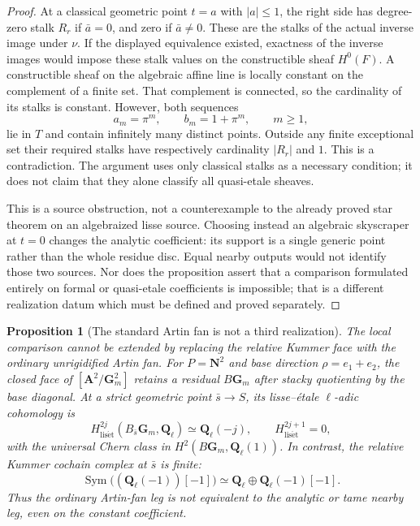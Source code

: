 \documentclass[11pt]{article}
\newtheorem{proposition}[theorem]{Proposition}
\theoremstyle{definition}
\theoremstyle{remark}
\begin{document}
\begin{proof}
At a classical geometric point $t=a$ with $|a|\le1$, the right side
has degree-zero stalk $R_r$ if $\bar a=0$, and zero if $\bar a\ne0$.
These are the stalks of the actual inverse image under $\nu$.
If the displayed equivalence existed, exactness of the inverse images
would impose these stalk values on the constructible sheaf $H^0(F)$.
A constructible sheaf on the algebraic affine line is locally constant
on the complement of a finite set.  That complement is connected, so
the cardinality of its stalks is constant.  However, both sequences
\[
 a_m=\pi^m,\qquad b_m=1+\pi^m,\qquad m\ge1,
\]
lie in $T$ and contain infinitely many distinct points.  Outside any
finite exceptional set their required stalks have respectively
cardinality $|R_r|$ and $1$.  This is a contradiction.  The argument
uses only classical stalks as a necessary condition; it does not claim
that they alone classify all quasi-etale sheaves.

This is a source obstruction, not a counterexample to the already
proved star theorem on an algebraized lisse source.  Choosing instead
an algebraic skyscraper at $t=0$ changes the analytic coefficient: its
support is a single generic point rather than the whole residue disc.
Equal nearby outputs would not identify those two sources.  Nor does
the proposition assert that a comparison formulated entirely on
formal or quasi-etale coefficients is impossible; that is a different
realization datum which must be defined and proved separately.
\end{proof}

\begin{proposition}[The standard Artin fan is not a third realization]
\label{prop:frag-artin-obstruction}
The local comparison cannot be extended by replacing the relative Kummer face with
the ordinary unrigidified Artin fan.  For $P=\mathbf N^2$ and base direction
$\rho=e_1+e_2$, the closed face of
$[\mathbf A^2/\mathbf G_m^2]$ retains a residual $B\mathbf G_m$ after
stacky quotienting by the base diagonal.  At a strict geometric point
$\bar s\to S$, its lisse--\'{e}tale \(\ell\)-adic cohomology is
\[
 H^{2j}_{\mathrm{lis\acute et}}
 (B_{\bar s}\mathbf G_m,\mathbf Q_\ell)
 \simeq\mathbf Q_\ell(-j),
 \qquad H^{2j+1}_{\mathrm{lis\acute et}}=0,
\]
with the universal Chern class in
$H^2(B\mathbf G_m,\mathbf Q_\ell(1))$.  In contrast, the relative Kummer
cochain complex at $\bar s$ is finite:
\[
 \operatorname{Sym}\bigl((\mathbf Q_\ell(-1))[-1]\bigr)
 \simeq \mathbf Q_\ell\oplus\mathbf Q_\ell(-1)[-1].
\]
Thus the ordinary Artin-fan leg is not equivalent to the analytic or tame
nearby leg, even on the constant coefficient.
\end{proposition}
\end{document}

